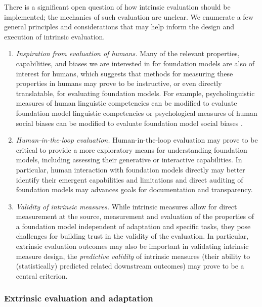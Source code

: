 There is a significant open question of how intrinsic evaluation should be implemented; the mechanics of such evaluation are unclear.
We enumerate a few general principles and considerations that may help inform the design and execution of intrinsic evaluation.
\begin{enumerate}
    \item \textit{Inspiration from evaluation of humans.} 
    Many of the relevant properties, capabilities, and biases we are interested in for foundation models are also of interest for humans, which suggests that methods for measuring these properties in humans may prove to be instructive, or even directly translatable, for evaluating foundation models. 
    For example, psycholinguistic measures of human linguistic competencies can be modified to evaluate foundation model linguistic competencies \citep{levy2008, frank2013, linzen2016assessing, ettinger2016, marvin2018, van-schijndel2018, futrell2019, prasad2019, ettinger2020} or psychological measures of human social biases can be modified to evaluate foundation model social biases \citep{greenwald1998, caliskan2017, may2019, guo2020}.
    \item \textit{Human-in-the-loop evaluation.}
    Human-in-the-loop evaluation may prove to be critical to provide a more exploratory means for understanding foundation models, including assessing their generative or interactive capabilities.
    In particular, human interaction with foundation models directly may better identify their emergent capabilities and limitations and direct auditing of foundation models \citep[\eg][]{raji2019} may advances goals for documentation and transparency.
    \item \textit{Validity of intrinsic measures.}
    While intrinsic measures allow for direct measurement at the source, \ie measurement and evaluation of the properties of a foundation model independent of adaptation and specific tasks, they pose challenges for building trust in the validity \cite{messick1987, messick1988} of the evaluation. 
    In particular, extrinsic evaluation outcomes may also be important in validating intrinsic measure design, \eg the \textit{predictive validity} of intrinsic measures (\ie their ability to (statistically) predicted related downstream outcomes) may prove to be a central criterion. 
\end{enumerate}

\subsubsection{Extrinsic evaluation and adaptation}
\label{sec:evaluation-adaptation}

